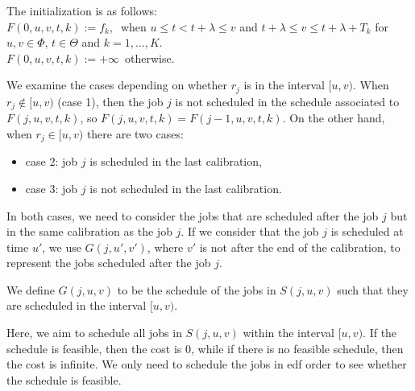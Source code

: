 The initialization is as follows:\\
$F(0,u,v,t,k):=f_k,~$ when $u\leq t < t + \lambda\leq v$ and $t+\lambda \leq v \leq t+\lambda + T_k$ for $u,v \in \Phi$, $t\in \Theta$ and $k=1,\ldots,K$.\\
$F(0,u,v,t,k):=+\infty$~otherwise.





We examine the cases depending on whether $r_j$ is in the interval $[u, v)$.
When $r_j \notin [u,v)$ (case 1), then the job $j$ is not scheduled in the schedule associated to $F(j,u,v,t,k)$, so $F(j,u,v,t,k)=F(j-1,u,v,t,k)$.
On the other hand, when $r_j\in [u,v)$ there are two cases: 
\begin{itemize}
\item case 2: job $j$ is scheduled in the last calibration,
\item case 3: job $j$ is not scheduled in the last calibration.
\end{itemize}
In both cases, we need to consider the jobs that are scheduled after the job $j$ but in the same calibration as the job $j$. If we consider that the job $j$ is scheduled at time $u'$, we use $G(j,u',v')$, where $v'$ is not after the end of the calibration, to represent the jobs scheduled after the job $j$.


\begin{definition}
We define $G(j,u,v)$ to be the schedule of the jobs in $S(j,u,v)$ such that they are scheduled in the interval $[u,v)$. 
\end{definition}
Here, we aim to schedule all jobs in $S(j,u,v)$ within the interval $[u,v)$. If the schedule is feasible, then the cost is 0, while if there is no feasible schedule, then the cost is infinite. We only need to schedule the jobs in {\sc edf} order to see whether the schedule is feasible.




